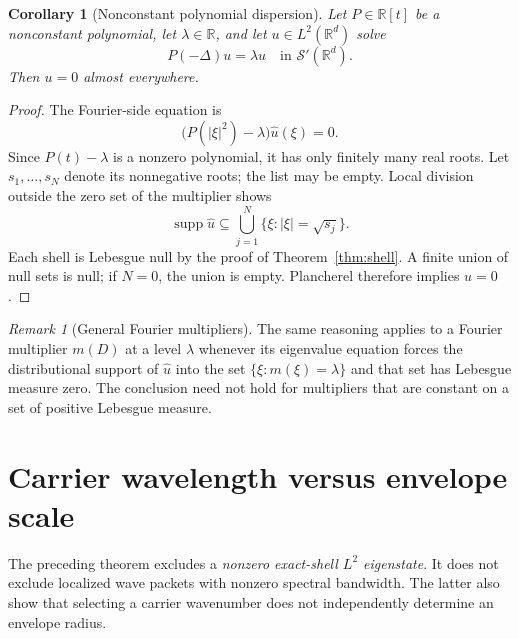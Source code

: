 \documentclass[11pt]{article}
\newtheorem{corollary}[theorem]{Corollary}
\theoremstyle{remark}
\newtheorem{remark}[theorem]{Remark}
\newcommand{\R}{\mathbb{R}}
\newcommand{\supp}{\operatorname{supp}}
\begin{document}
\begin{corollary}[Nonconstant polynomial dispersion]
\label{cor:poly}
Let $P\in\R[t]$ be a nonconstant polynomial, let $\lambda\in\R$,
and let $u\in L^2(\R^d)$ solve
\begin{equation}
 P(-\Delta)u=\lambda u
 \quad\text{in }\mathcal S'(\R^d).
 \label{eq:poly}
\end{equation}
Then $u=0$ almost everywhere.
\end{corollary}

\begin{proof}
The Fourier-side equation is
\begin{equation}
 \bigl(P(|\xi|^2)-\lambda\bigr)\widehat u(\xi)=0.
 \label{eq:poly-mult}
\end{equation}
Since $P(t)-\lambda$ is a nonzero polynomial, it has only finitely
many real roots.  Let $s_1,\ldots,s_N$ denote its nonnegative roots;
the list may be empty.  Local division outside the zero set of the
multiplier shows
\begin{equation}
 \supp\widehat u\subseteq
 \bigcup_{j=1}^N\{\xi:|\xi|=\sqrt{s_j}\}.
 \label{eq:finite-shells}
\end{equation}
Each shell is Lebesgue null by the proof of
Theorem~\ref{thm:shell}.  A finite union of null sets is null; if
$N=0$, the union is empty.  Plancherel therefore implies $u=0$.
\end{proof}

\begin{remark}[General Fourier multipliers]
The same reasoning applies to a Fourier multiplier $m(D)$ at a level
$\lambda$ whenever its eigenvalue equation forces the distributional
support of $\widehat u$ into the set
$\{\xi:m(\xi)=\lambda\}$ and that set has Lebesgue measure zero.
The conclusion need not hold for multipliers that are constant on a
set of positive Lebesgue measure.
\end{remark}

\section{Carrier wavelength versus envelope scale}
The preceding theorem excludes a \emph{nonzero exact-shell $L^2$
eigenstate}.  It does not exclude localized wave packets with nonzero
spectral bandwidth.  The latter also show that selecting a carrier
wavenumber does not independently determine an envelope radius.
\end{document}
